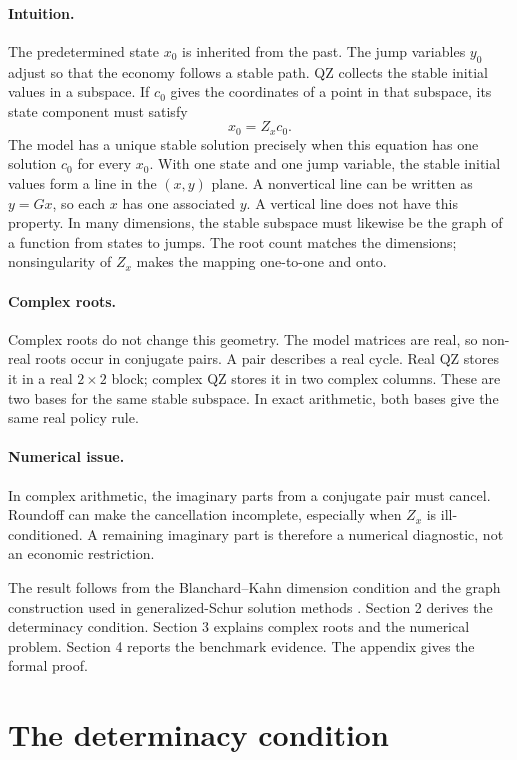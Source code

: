 \documentclass[11pt]{article}
\begin{document}
\paragraph{Intuition.}
The predetermined state $x_0$ is inherited from the past. The jump variables
$y_0$ adjust so that the economy follows a stable path. QZ collects the stable
initial values in a subspace. If $c_0$ gives the coordinates of a point in
that subspace, its state component must satisfy
\[
    x_0=Z_xc_0.
\]
The model has a unique stable solution precisely when this equation has one
solution $c_0$ for every $x_0$. With one state and one jump variable, the
stable initial values form a line in the $(x,y)$ plane. A nonvertical line can
be written as $y=Gx$, so each $x$ has one associated $y$. A vertical line does
not have this property. In many dimensions, the stable subspace must likewise
be the graph of a function from states to jumps. The root count matches the
dimensions; nonsingularity of $Z_x$ makes the mapping one-to-one and onto.

\paragraph{Complex roots.}
Complex roots do not change this geometry. The model matrices are real, so
non-real roots occur in conjugate pairs. A pair describes a real cycle. Real
QZ stores it in a real $2\times2$ block; complex QZ stores it in two complex
columns. These are two bases for the same stable subspace. In exact arithmetic,
both bases give the same real policy rule.

\paragraph{Numerical issue.}
In complex arithmetic, the imaginary parts from a conjugate pair must cancel.
Roundoff can make the cancellation incomplete, especially when $Z_x$ is
ill-conditioned. A remaining imaginary part is therefore a numerical
diagnostic, not an economic restriction.

The result follows from the Blanchard--Kahn dimension condition and the graph
construction used in generalized-Schur solution methods
\cite{bk1980,klein2000,sims2002}. Section 2 derives the determinacy condition.
Section 3 explains complex roots and the numerical problem. Section 4 reports
the benchmark evidence. The appendix gives the formal proof.

\section{The determinacy condition}
\end{document}
